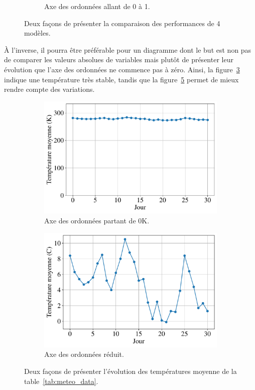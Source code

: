 \begin{figure}[h]
\begin{subfigure}[t]{0.47\textwidth}
    \caption{Axe des ordonnées allant de 0 à 1.}
    \label{fig:bars_start_zero}
  \end{subfigure}  
  \caption{Deux façons de présenter la comparaison des performances de 4 modèles.}
\end{figure}

À l'inverse, il pourra être préférable pour un diagramme dont le but est non
pas de comparer les valeurs absolues de variables mais plutôt de présenter leur
évolution que l'axe des ordonnées ne commence pas à zéro. Ainsi, la
figure~\ref{fig:line_start_zero} indique une température très stable, tandis
que la figure~\ref{fig:line_start_nonzero} permet de mieux rendre compte des
variations.
\begin{figure}[h]
  \centering
  \begin{subfigure}[t]{0.47\textwidth}
    \centering
    \includegraphics[width=\textwidth]{figures/pratiques/line_start_zero}
    \caption{Axe des ordonnées partant de 0K.}
    \label{fig:line_start_zero}
  \end{subfigure} \hfill
  \begin{subfigure}[t]{0.47\textwidth}
    \includegraphics[width=\textwidth]{figures/pratiques/line_start_nonzero}  
    \caption{Axe des ordonnées réduit.}
    \label{fig:line_start_nonzero}
  \end{subfigure}  
  \caption{Deux façons de présenter l'évolution des températures moyenne de la
    table~\ref{tab:meteo_data}.}
\end{figure}

